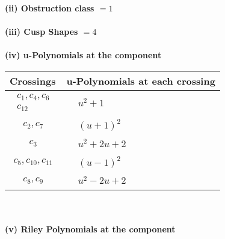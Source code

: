 \documentclass[1p]{elsarticle_modified}
\theoremstyle{definition}
\begin{document}
\flushleft \textbf{(ii) Obstruction class $= 1$}\\~\\
\flushleft \textbf{(iii) Cusp Shapes $= 4$}\\~\\
\newpage\renewcommand{\arraystretch}{1}
\flushleft \textbf{(iv) u-Polynomials at the component}\newline \\
\begin{tabular}{m{50pt}|m{274pt}}
Crossings & \hspace{64pt}u-Polynomials at each crossing \\
\hline $$\begin{aligned}c_{1},c_{4},c_{6}\\c_{12}\end{aligned}$$&$\begin{aligned}
&u^2+1
\end{aligned}$\\
\hline $$\begin{aligned}c_{2},c_{7}\end{aligned}$$&$\begin{aligned}
&(u+1)^2
\end{aligned}$\\
\hline $$\begin{aligned}c_{3}\end{aligned}$$&$\begin{aligned}
&u^2+2 u+2
\end{aligned}$\\
\hline $$\begin{aligned}c_{5},c_{10},c_{11}\end{aligned}$$&$\begin{aligned}
&(u-1)^2
\end{aligned}$\\
\hline $$\begin{aligned}c_{8},c_{9}\end{aligned}$$&$\begin{aligned}
&u^2-2 u+2
\end{aligned}$\\
\hline
\end{tabular}\\~\\
\newpage\renewcommand{\arraystretch}{1}
\flushleft \textbf{(v) Riley Polynomials at the component}\newline \\
\end{document}
